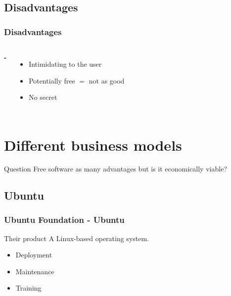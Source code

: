 \documentclass{beamer}
\begin{document}
\subsection{Disadvantages}

\begin{frame}

  \frametitle{Disadvantages}

  \begin{columns}

    \Huge{\textbf{-}}

    \begin{itemize}
      \item<2->{Intimidating to the user}
      \item<3->{Potentially free $=$ not as good}
      \item<4>{No secret}
    \end{itemize}

  \end{columns}

\end{frame}

\section{Different business models}

\begin{frame}

  \begin{block}{Question}
    Free software as many advantages but is it economically viable?
  \end{block}

  \vfill




\end{frame}

\subsection{Ubuntu}

\begin{frame}

  \frametitle{Ubuntu Foundation - Ubuntu}

  \begin{block}{Their product}
    A Linux-based operating system.
  \end{block}

  \vfill

  \begin{itemize}
    \item<2>{Deployment}
    \item<3>{Maintenance}
    \item<4>{Training}
  \end{itemize}

\end{frame}
\end{document}
